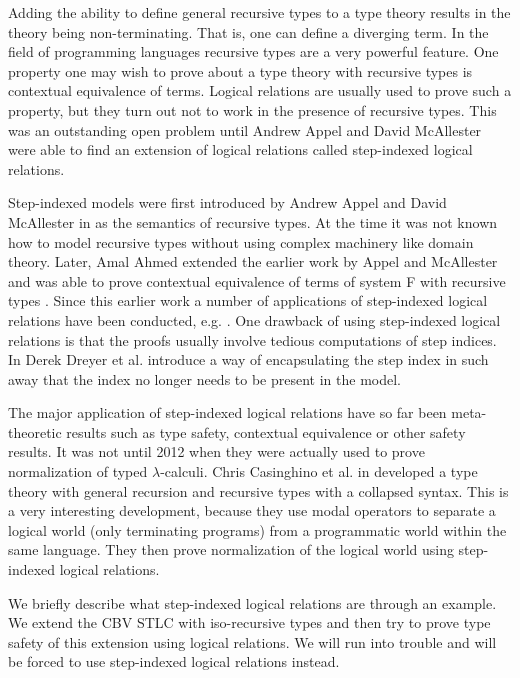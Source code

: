 Adding the ability to define general recursive types to a type theory
results in the theory being non-terminating.  That is, one can define a
diverging term.  In the field of programming languages recursive
types are a very powerful feature.  One property one may wish to prove
about a type theory with recursive types is contextual equivalence of
terms.  Logical relations are usually used to prove such a property,
but they turn out not to work in the presence of recursive types.
This was an outstanding open problem until Andrew Appel and David
McAllester were able to find an extension of logical relations called
step-indexed logical relations.

Step-indexed models were first introduced by Andrew Appel and David
McAllester in \cite{Appel:2001} as the semantics of recursive types.
At the time it was not known how to model recursive types without
using complex machinery like domain theory.  Later, Amal Ahmed
extended the earlier work by Appel and McAllester and was able to
prove contextual equivalence of terms of system F with recursive types
\cite{Ahmed:2006}.  Since this earlier work a number of applications
of step-indexed logical relations have been conducted, e.g.
\cite{Acar:2008,Ahmed:2009,Neis:2009,Vytiniotis:2009}.  One drawback
of using step-indexed logical relations is that the proofs usually
involve tedious computations of step indices.  In \cite{Dreyer:2010}
Derek Dreyer et al. introduce a way of encapsulating the step index in
such away that the index no longer needs to be present in the model.

The major application of step-indexed logical relations have so far been
meta-theoretic results such as type safety, contextual equivalence or
other safety results. It was not until 2012 when they were actually
used to prove normalization of typed $\lambda$-calculi.  Chris
Casinghino et al. in \cite{Casinghino:2012} developed a type theory
with general recursion and recursive types with a collapsed syntax.
This is a very interesting development, because they use modal
operators to separate a logical world (only terminating programs) from
a programmatic world within the same language.  They then prove
normalization of the logical world using step-indexed logical relations.

We briefly describe what step-indexed logical relations are through an
example.  We extend the CBV STLC with iso-recursive types and then try
to prove type safety of this extension using logical relations.  We
will run into trouble and will be forced to use step-indexed logical
relations instead.



